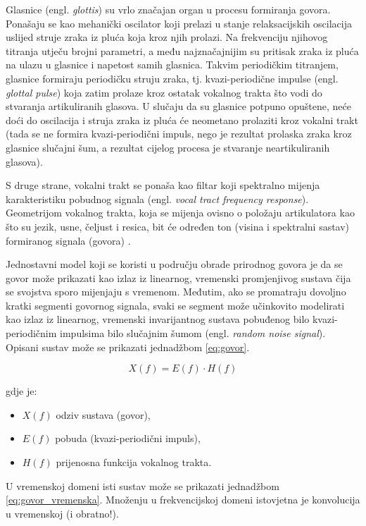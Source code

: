Glasnice (engl. \textit{glottis}) su vrlo značajan organ u procesu formiranja govora. 
Ponašaju se kao mehanički
oscilator koji prelazi u stanje relaksacijskih oscilacija uslijed struje zraka iz pluća koja kroz njih
prolazi. Na frekvenciju njihovog titranja utječu brojni parametri, a među najznačajnijim su
pritisak zraka iz pluća na ulazu u glasnice i napetost samih glasnica.
Takvim periodičkim titranjem, glasnice formiraju periodičku struju zraka, tj. 
kvazi-periodične impulse (engl. \textit{glottal pulse}) koja zatim prolaze kroz ostatak 
vokalnog trakta što vodi do stvaranja artikuliranih glasova. U slučaju da 
su glasnice potpuno opuštene, neće
doći do oscilacija i struja zraka iz pluća će neometano prolaziti kroz vokalni trakt 
(tada se ne formira kvazi-periodični impuls, nego je rezultat prolaska zraka kroz glasnice
slučajni šum, a rezultat cijelog procesa je stvaranje neartikuliranih glasova). 

S druge strane, vokalni trakt se ponaša kao filtar koji spektralno mijenja karakteristiku
pobudnog signala (engl. \textit{vocal tract frequency response}). 
Geometrijom vokalnog trakta, koja se mijenja ovisno o položaju 
artikulatora kao što su jezik, usne, čeljust i resica, bit će određen ton (visina i
spektralni sastav) formiranog signala (govora) \cite{petrinovic2002}. 

Jednostavni model koji se koristi u području obrade prirodnog govora je da se govor 
može prikazati kao izlaz iz linearnog, vremenski promjenjivog sustava čija se 
svojstva sporo mijenjaju s vremenom. Međutim, ako se promatraju dovoljno kratki
segmenti govornog signala, svaki se segment može učinkovito modelirati kao izlaz
iz linearnog, vremenski invarijantnog sustava pobuđenog bilo
kvazi-periodičnim impulsima bilo slučajnim šumom (engl. \textit{random noise signal}).
Opisani sustav može se prikazati jednadžbom \ref{eq:govor}.

\begin{equation}
    X(f) = E(f) \cdot H(f)
    \label{eq:govor}
\end{equation}

gdje je:
\begin{itemize}
    \item \(X(f)\) odziv sustava (govor),
    \item \(E(f)\) pobuda (kvazi-periodični impuls),
    \item \(H(f)\) prijenosna funkcija vokalnog trakta.
\end{itemize}

U vremenskoj domeni isti sustav može se prikazati jednadžbom \ref{eq:govor_vremenska}.
Množenju u frekvencijskoj domeni istovjetna je konvolucija u vremenskoj (i obratno!).

